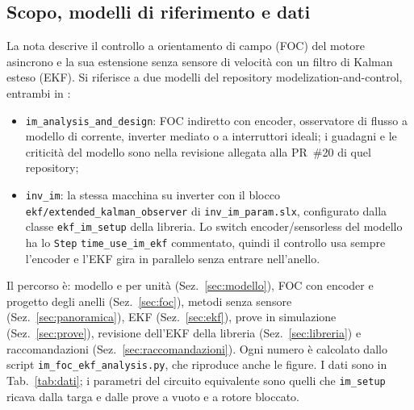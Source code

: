 \documentclass[10pt,a4paper]{scrartcl}
\newcommand{\code}[1]{\texttt{#1}}
\begin{document}

\tableofcontents
\newpage
\begin{onehalfspace}

\section{Scopo, modelli di riferimento e dati}
\label{sec:scopo}

La nota descrive il controllo a orientamento di campo (FOC) del motore asincrono e la sua estensione senza sensore di velocità con un filtro di Kalman esteso (EKF). Si riferisce a due modelli del repository modelization-and-control, entrambi in :
\begin{itemize}
\item \code{im\_analysis\_and\_design}: FOC indiretto con encoder, osservatore di flusso a modello di corrente, inverter mediato o a interruttori ideali; i guadagni e le criticità del modello sono nella revisione allegata alla PR~\#20 di quel repository;
\item \code{inv\_im}: la stessa macchina su inverter con il blocco \code{ekf/extended\_kalman\_observer} di \code{inv\_im\_param.slx}, configurato dalla classe \code{ekf\_im\_setup} della libreria. Lo switch encoder/sensorless del modello ha lo \code{Step} \code{time\_use\_im\_ekf} commentato, quindi il controllo usa sempre l'encoder e l'EKF gira in parallelo senza entrare nell'anello.
\end{itemize}

Il percorso è: modello e per unità (Sez.~\ref{sec:modello}), FOC con encoder e progetto degli anelli (Sez.~\ref{sec:foc}), metodi senza sensore (Sez.~\ref{sec:panoramica}), EKF (Sez.~\ref{sec:ekf}), prove in simulazione (Sez.~\ref{sec:prove}), revisione dell'EKF della libreria (Sez.~\ref{sec:libreria}) e raccomandazioni (Sez.~\ref{sec:raccomandazioni}). Ogni numero è calcolato dallo script \code{im\_foc\_ekf\_analysis.py}, che riproduce anche le figure. I dati sono in Tab.~\ref{tab:dati}; i parametri del circuito equivalente sono quelli che \code{im\_setup} ricava dalla targa e dalle prove a vuoto e a rotore bloccato.


\end{onehalfspace}
\end{document}
